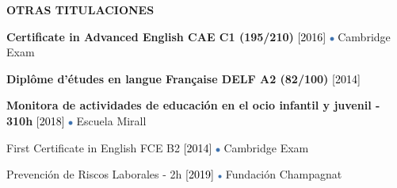 \documentclass[../main.tex]{subfiles}
\begin{document}
    \vspace*{0.5cm}
    \textbf{\textcolor{myCV2}{OTRAS TITULACIONES\underline{\hspace{5.05cm}}}}
        \vspace*{0.3cm}
        
        \textbf{Certificate in Advanced English CAE C1 (195/210)}
        \textcolor{black}{[2016]}
        \includegraphics[width=0.15cm]{assets/full.png} 
        Cambridge Exam
        
        \vspace*{0.25cm}
        \textbf{Diplôme d'études en langue Française DELF A2 (82/100)} 
        \textcolor{black}{[2014]}
        
        \vspace*{0.25cm}
        \textbf{Monitora de actividades de educación en el ocio infantil y juvenil - 310h}
        \textcolor{black}{[2018]}
        \includegraphics[width=0.15cm]{assets/full.png} 
        Escuela Mirall
        
        \vspace*{0.25cm}
        First Certificate in English FCE B2
        \textcolor{black}{[2014]}
        \includegraphics[width=0.15cm]{assets/full.png} 
        Cambridge Exam 

        \vspace*{0.25cm}
        Prevención de Riscos Laborales - 2h
        \textcolor{black}{[2019]}
        \includegraphics[width=0.15cm]{assets/full.png}
        Fundación Champagnat

\end{document}
